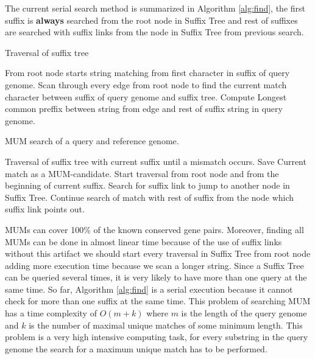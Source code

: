 \documentclass[3p,times]{elsarticle}
\begin{document}
 The current serial search method is summarized in Algorithm \ref{alg:find}, the first suffix is \textbf{always} searched from the root node in Suffix Tree and rest of suffixes are searched with suffix links from the node in Suffix Tree from previous search.\\
 \begin{algorithm}
   \caption{Traversal of suffix tree}
   \begin{algorithmic}[1]
     \State From root node starts string matching from first character in suffix of query genome.
     \State Scan through every edge from root node to find the current match character between suffix of query genome and suffix tree.
     \State Compute Longest common preffix between string from edge and rest of suffix string in query genome.
     \EndIf
   \end{algorithmic}
 \end{algorithm}
 \begin{algorithm}
   \caption{MUM search of a query and reference genome.} \label{alg:find}
 \begin{algorithmic}[1]
   \State Traversal of suffix tree with current suffix until a mismatch occurs.
   \State Save Current match as a MUM-candidate. 
   \EndIf
   \State Start traversal from root node and from the beginning of current suffix.
   \State Search for suffix link to jump to another node in Suffix Tree.
   \State Continue search of match with rest of suffix from the node which suffix link points out.
   \EndIf
   \EndFor
 \end{algorithmic}
 \end{algorithm}
 MUMs can cover 100\% of the known  conserved gene pairs. Moreover, finding all MUMs  can be done in almost linear time because of the use of suffix links without this artifact we should start every traversal in Suffix Tree from root node adding more execution time because we scan a longer string. Since a Suffix Tree can be queried several times, it is very likely to have more than one query  at the same time. So far, Algorithm \ref{alg:find} is a serial execution because it cannot check for more than one suffix at the same time.
This problem of searching MUM has a time complexity of $O(m+k)$ where $m$ is the length of the query genome and $k$ is the number of maximal unique matches of some minimum length. This problem is a very high intensive computing task, for every substring in the query genome the search for a maximum unique match has to be performed.
\end{document}
